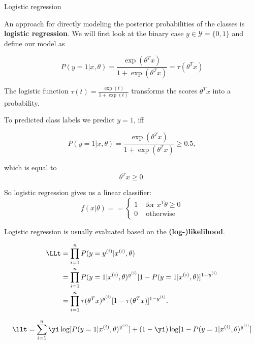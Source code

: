 
\begin{vbframe}{Logistic regression}

An approach for directly modeling the posterior probabilities of the classes is \textbf{logistic regression}. We will first look at the binary case $y \in \mathcal{Y}=\{0, 1\}$ and define our model as

$$
 P(y = 1 | x, \theta)= \frac{\exp(\theta^Tx)}{1+\exp(\theta^Tx)} = \tau(\theta^T x)
$$


\lz

The logistic function $\tau(t) = \frac{\exp(t)}{1 + \exp(t)}$
transforms the scores 
$\theta^Tx$ into a probability.

\framebreak

\lz

To predicted class labels we predict $y=1$, iff

$$
 P(y = 1 | x, \theta) = \frac{\exp(\theta^T x)}{1+\exp(\theta^Tx)} \ge 0.5,
$$

which is equal to
$$
\theta^T x \ge 0.
$$

So logistic regression gives us a linear classifier:
$$
f(x| \theta) =
=\begin{cases}
1 & \text{ for } x^T\theta \ge 0 \\
0 & \text{ otherwise}
\end{cases}
$$


\framebreak

Logistic regression is usually evaluated based on the \textbf{(log-)likelihood}.

\vspace{-0.2cm}
\small
\begin{align*}
\LLt &= \prod_{i=1}^n P(y = y^{(i)} | x^{(i)}, \theta) \\
 &= \prod_{i=1}^n  P(y = 1 | x^{(i)}, \theta)^{y^{(i)}}[1 - P(y = 1 | x^{(i)}, \theta)]^{1 - y^{(i)}} \\
&= \prod_{i=1}^n  \tau(\theta^T x)^{y^{(i)}} [1 -  \tau(\theta^T x)]^{1 - y^{(i)}}.\\
\end{align*}

\vspace{-0.5cm}
\small
\begin{align*}
\llt &= \sum_{i=1}^n \yi \log[ P(y = 1 | x^{(i)}, \theta)^{y^{(i)}}] + (1-\yi) \log [1 - P(y = 1 | x^{(i)}, \theta)^{y^{(i)}}]\\
\end{align*}


\end{vbframe}
